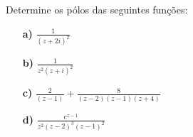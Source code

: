 \linespread{1.5}
Determine os pólos das seguintes funções:
{\Large \begin{itemize}
    \item[\textbf{a)}] $\frac{1}{(z+2i)^2}$
    \item[\textbf{b)}] $\frac{1}{z^2(z+i)^2}$
    \item[\textbf{c)}] $\frac{2}{(z-1)} + \frac{8}{(z-2)(z-1)(z+4)}$
    \item[\textbf{d)}] $\frac{e^{z-1}}{z^2(z-2)^3(z-1)^2}$
\end{itemize}}